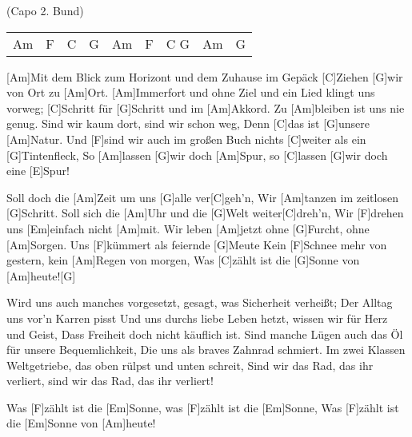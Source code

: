 
{\footnotesize(Capo 2. Bund)}



\begin{guitar}
	{\footnotesize\begin{tabular}{l|l|l|l|l|l|l|l|l}
			Am & F & C & G & Am & F & C G & Am & G 
	\end{tabular}}
	
	[Am]Mit dem Blick zum Horizont und dem Zuhause im Gepäck
	[C]Ziehen [G]wir von Ort zu [Am]Ort.
	[Am]Immerfort und ohne Ziel und ein Lied klingt uns vorweg;
	[C]Schritt für [G]Schritt und im [Am]Akkord.
	Zu [Am]bleiben ist uns nie genug. Sind wir kaum dort, sind wir schon weg,
	Denn [C]das ist [G]unsere [Am]Natur.
	Und [F]sind wir auch im großen Buch nichts [C]weiter als ein [G]Tintenfleck,
	So [Am]lassen [G]wir doch [Am]Spur, so [C]lassen [G]wir doch eine [E]Spur!
	
	Soll doch die [Am]Zeit um uns [G]alle ver[C]geh'n,
	Wir [Am]tanzen im zeitlosen [G]Schritt.
	Soll sich die [Am]Uhr und die [G]Welt weiter[C]dreh'n, 
	Wir [F]drehen uns [Em]einfach nicht [Am]mit.
	Wir leben [Am]jetzt ohne [G]Furcht, ohne [Am]Sorgen.
	Uns [F]kümmert als feiernde [G]Meute
	Kein [F]Schnee mehr von gestern, kein [Am]Regen von morgen,
	Was [C]zählt ist die [G]Sonne von [Am]heute![G]{}
	
	
	\pagebreak
	
	Wird uns auch manches vorgesetzt, gesagt, was Sicherheit verheißt;
	Der Alltag uns vor'n Karren pisst
	Und uns durchs liebe Leben hetzt, wissen wir für Herz und Geist,
	Dass Freiheit doch nicht käuflich ist.
	Sind manche Lügen auch das Öl für unsere Bequemlichkeit,
	Die uns als braves Zahnrad schmiert.
	Im zwei Klassen Weltgetriebe, das oben rülpst und unten schreit,
	Sind wir das Rad, das ihr verliert, sind wir das Rad, das ihr verliert!
	
	Was [F]zählt ist die [Em]Sonne, was [F]zählt ist die [Em]Sonne, 
	Was [F]zählt ist die [Em]Sonne von [Am]heute!
	

\end{guitar}
